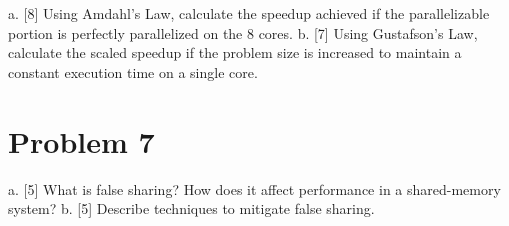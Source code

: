 \documentclass{article}
\begin{document}
a. [8] Using Amdahl's Law, calculate the speedup achieved if the parallelizable portion is perfectly parallelized on the 8 cores.
b. [7] Using Gustafson's Law, calculate the scaled speedup if the problem size is increased to maintain a constant execution time on a single core.


\section*{Problem 7}
a. [5] What is false sharing? How does it affect performance in a shared-memory system?
b. [5]  Describe techniques to mitigate false sharing.
\end{document}
